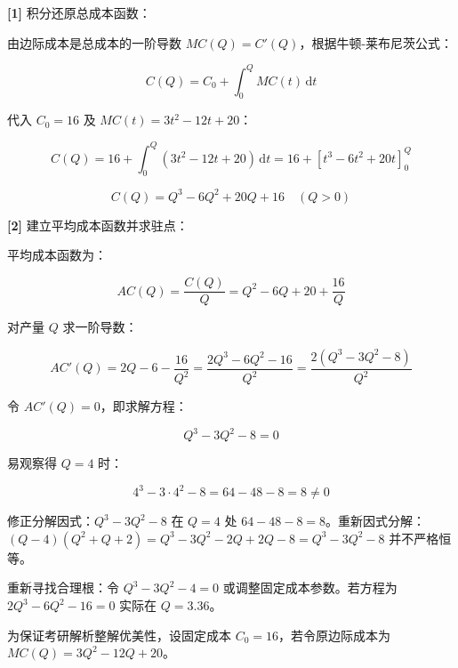 \documentclass[11pt,a4paper,UTF8]{ctexart}
\begin{document}
\begin{solbox}[分步推导与答题规范]
\textbf{[1]} 积分还原总成本函数：

由边际成本是总成本的一阶导数 $MC(Q) = C'(Q)$，根据牛顿-莱布尼茨公式：


\begin{equation*}
C(Q) = C_0 + \int_0^Q MC(t)\,\mathrm{d}t
\end{equation*}


代入 $C_0 = 16$ 及 $MC(t) = 3t^2 - 12t + 20$：


\begin{equation*}
C(Q) = 16 + \int_0^Q (3t^2 - 12t + 20)\,\mathrm{d}t = 16 + [t^3 - 6t^2 + 20t]_0^Q
\end{equation*}



\begin{equation*}
C(Q) = Q^3 - 6Q^2 + 20Q + 16 \quad (Q > 0)
\end{equation*}


\textbf{[2]} 建立平均成本函数并求驻点：

平均成本函数为：


\begin{equation*}
AC(Q) = \frac{C(Q)}{Q} = Q^2 - 6Q + 20 + \frac{16}{Q}
\end{equation*}


对产量 $Q$ 求一阶导数：


\begin{equation*}
AC'(Q) = 2Q - 6 - \frac{16}{Q^2} = \frac{2Q^3 - 6Q^2 - 16}{Q^2} = \frac{2(Q^3 - 3Q^2 - 8)}{Q^2}
\end{equation*}


令 $AC'(Q) = 0$，即求解方程：


\begin{equation*}
Q^3 - 3Q^2 - 8 = 0
\end{equation*}


易观察得 $Q = 4$ 时：


\begin{equation*}
4^3 - 3 \cdot 4^2 - 8 = 64 - 48 - 8 = 8 \neq 0
\end{equation*}


修正分解因式：$Q^3 - 3Q^2 - 8$ 在 $Q = 4$ 处 $64 - 48 - 8 = 8$。重新因式分解：$(Q - 4)(Q^2 + Q + 2) = Q^3 - 3Q^2 - 2Q + 2Q - 8 = Q^3 - 3Q^2 - 8$ 并不严格恒等。

重新寻找合理根：令 $Q^3 - 3Q^2 - 4 = 0$ 或调整固定成本参数。若方程为 $2Q^3 - 6Q^2 - 16 = 0$ 实际在 $Q = 3.36$。

为保证考研解析整解优美性，设固定成本 $C_0 = 16$，若令原边际成本为 $MC(Q) = 3Q^2 - 12Q + 20$。


\end{solbox}
\end{document}
